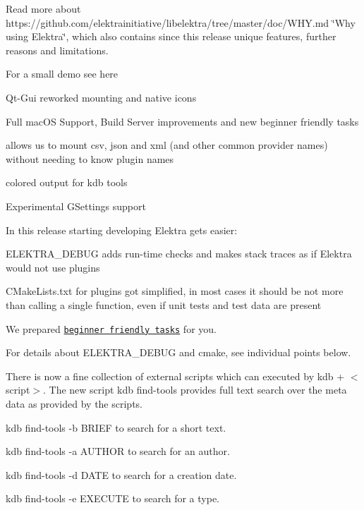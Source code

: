 Read more about https\+://github.com/elektrainitiative/libelektra/tree/master/doc/\+W\+H\+Y.\+md \char`\"{}\+Why using Elektra\char`\"{}, which also contains since this release unique features, further reasons and limitations.

For a small demo see here

\href{https://asciinema.org/a/cantr04assr4jkv8v34uz9b8r}{\tt }


\begin{DoxyItemize}
\item Qt-\/\+Gui reworked mounting and native icons
\item Full mac\+OS Support, Build Server improvements and new beginner friendly tasks
\item allows us to mount csv, json and xml (and other common provider names) without needing to know plugin names
\item colored output for kdb tools
\item Experimental G\+Settings support
\end{DoxyItemize}

In this release starting developing Elektra gets easier\+:


\begin{DoxyItemize}
\item {\ttfamily E\+L\+E\+K\+T\+R\+A\+\_\+\+D\+E\+B\+UG} adds run-\/time checks and makes stack traces as if Elektra would not use plugins
\item {\ttfamily C\+Make\+Lists.\+txt} for plugins got simplified, in most cases it should be not more than calling a single function, even if unit tests and test data are present
\item We prepared \href{https://github.com/ElektraInitiative/libelektra/issues?q=is%3Aissue+is%3Aopen+label%3A%22beginner+friendly%22}{\tt beginner friendly tasks} for you.
\end{DoxyItemize}

For details about {\ttfamily E\+L\+E\+K\+T\+R\+A\+\_\+\+D\+E\+B\+UG} and cmake, see individual points below.

There is now a fine collection of external scripts which can executed by {\ttfamily kdb + $<$script$>$}. The new script {\ttfamily kdb find-\/tools} provides full text search over the meta data as provided by the scripts.


\begin{DoxyItemize}
\item {\ttfamily kdb find-\/tools -\/b B\+R\+I\+EF} to search for a short text.
\item {\ttfamily kdb find-\/tools -\/a A\+U\+T\+H\+OR} to search for an author.
\item {\ttfamily kdb find-\/tools -\/d D\+A\+TE} to search for a creation date.
\item {\ttfamily kdb find-\/tools -\/e E\+X\+E\+C\+U\+TE} to search for a type.
\end{DoxyItemize}

